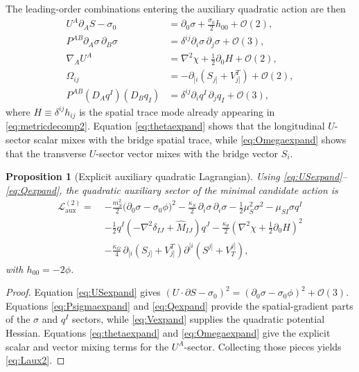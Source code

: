 \documentclass[11pt]{article}
\newtheorem{proposition}{Proposition}
\begin{document}
The leading-order combinations entering the auxiliary quadratic action are then
\begin{align}
U^A\partial_AS-\sigma_0
&=
\partial_0\sigma+\frac{\sigma_0}{2}h_{00}
+\mathcal O(2),
\label{eq:USexpand}
\\
P^{AB}\partial_A\sigma\,\partial_B\sigma
&=
\delta^{ij}\partial_i\sigma\,\partial_j\sigma
+\mathcal O(3),
\label{eq:Psigmaexpand}
\\
\nabla_AU^A
&=
\nabla^2\chi+\frac{1}{2}\partial_0H
+\mathcal O(2),
\label{eq:thetaexpand}
\\
\Omega_{ij}
&=
-\partial_{[i}\!\left(S_{j]}+V^T_{j]}\right)
+\mathcal O(2),
\label{eq:Omegaexpand}
\\
P^{AB}(D_Aq^I)(D_Bq_I)
&=
\delta^{ij}\partial_iq^I\,\partial_jq_I
+\mathcal O(3),
\label{eq:Qexpand}
\end{align}
where \(H\equiv \delta^{ij}h_{ij}\) is the spatial trace mode already appearing in \eqref{eq:metricdecomp2}. Equation \eqref{eq:thetaexpand} shows that the longitudinal \(U\)-sector scalar mixes with the bridge spatial trace, while \eqref{eq:Omegaexpand} shows that the transverse \(U\)-sector vector mixes with the bridge vector \(S_i\).

\begin{proposition}[Explicit auxiliary quadratic Lagrangian]
Using \eqref{eq:USexpand}--\eqref{eq:Qexpand}, the quadratic auxiliary sector of the minimal candidate action is
\begin{align}
\mathcal L_{\mathrm{aux}}^{(2)}
=\;&
-\frac{m_S^2}{2}\bigl(\partial_0\sigma-\sigma_0\phi\bigr)^2
-\frac{\kappa_S}{2}\,\partial_i\sigma\,\partial_i\sigma
-\frac{1}{2}\mu_S^2\sigma^2
-\mu_{SI}\sigma q^I
\nonumber\\
&-\frac{1}{2}q^I\!\left(-\nabla^2\delta_{IJ}+\widehat M_{IJ}\right)\!q^J
-\frac{\kappa_\theta}{2}\left(\nabla^2\chi+\frac{1}{2}\partial_0H\right)^2
\nonumber\\
&-\frac{\kappa_\Omega}{4}\,
\partial_{[i}\!\left(S_{j]}+V^T_{j]}\right)
\partial^{[i}\!\left(S^{j]}+V_T^{j]}\right),
\label{eq:Laux2}
\end{align}
with \(h_{00}=-2\phi\).
\end{proposition}

\begin{proof}
Equation \eqref{eq:USexpand} gives \((U\cdot\partial S-\sigma_0)^2=(\partial_0\sigma-\sigma_0\phi)^2+\mathcal O(3)\). Equations \eqref{eq:Psigmaexpand} and \eqref{eq:Qexpand} provide the spatial-gradient parts of the \(\sigma\) and \(q^I\) sectors, while \eqref{eq:Vexpand} supplies the quadratic potential Hessian. Equations \eqref{eq:thetaexpand} and \eqref{eq:Omegaexpand} give the explicit scalar and vector mixing terms for the \(U^A\)-sector. Collecting those pieces yields \eqref{eq:Laux2}.
\end{proof}
\end{document}
